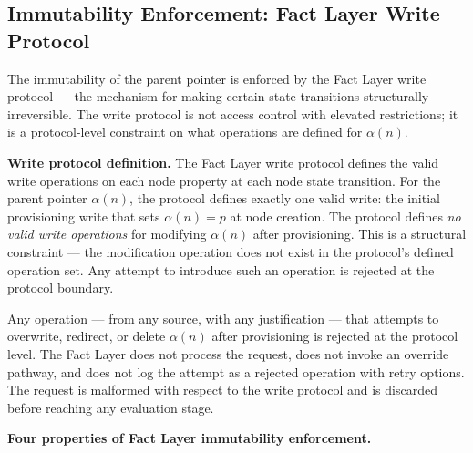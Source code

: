 \subsection{Immutability Enforcement: Fact Layer Write Protocol}
\label{sec:fact-layer-write-protocol}

The immutability of the parent pointer is enforced by the Fact Layer write protocol --- the \bxthree{} mechanism for making certain state transitions structurally irreversible. The write protocol is not access control with elevated restrictions; it is a protocol-level constraint on what operations are defined for $\alpha(n)$.

\bigskip
\noindent\textbf{Write protocol definition.} The Fact Layer write protocol defines the valid write operations on each node property at each node state transition. For the parent pointer $\alpha(n)$, the protocol defines exactly one valid write: the initial provisioning write that sets $\alpha(n) = p$ at node creation. The protocol defines \emph{no valid write operations} for modifying $\alpha(n)$ after provisioning. This is a structural constraint --- the modification operation does not exist in the protocol's defined operation set. Any attempt to introduce such an operation is rejected at the protocol boundary.

Any operation --- from any source, with any justification --- that attempts to overwrite, redirect, or delete $\alpha(n)$ after provisioning is rejected at the protocol level. The Fact Layer does not process the request, does not invoke an override pathway, and does not log the attempt as a rejected operation with retry options. The request is malformed with respect to the write protocol and is discarded before reaching any evaluation stage.

\bigskip
\noindent\textbf{Four properties of Fact Layer immutability enforcement.}

